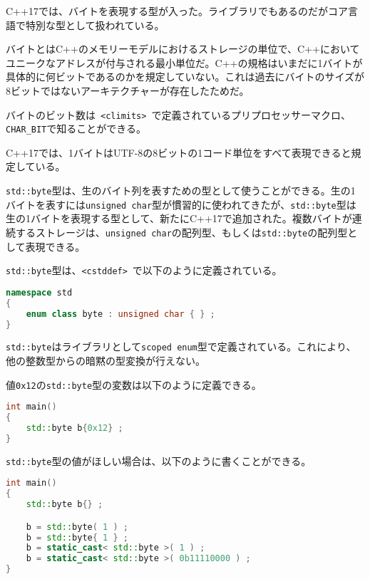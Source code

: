 %

C++17では、バイトを表現する型が入った。ライブラリでもあるのだがコア言語で特別な型として扱われている。

バイトとはC++のメモリーモデルにおけるストレージの単位で、C++においてユニークなアドレスが付与される最小単位だ。C++の規格はいまだに1バイトが具体的に何ビットであるのかを規定していない。これは過去にバイトのサイズが8ビットではないアーキテクチャーが存在したためだ。

バイトのビット数は~\lstinline!<climits>!~で定義されているプリプロセッサーマクロ、\lstinline!CHAR_BIT!で知ることができる。

C++17では、1バイトはUTF-8の8ビットの1コード単位をすべて表現できると規定している。

\lstinline!std::byte!型は、生のバイト列を表すための型として使うことができる。生の1バイトを表すには\lstinline!unsigned char!型が慣習的に使われてきたが、\lstinline!std::byte!型は生の1バイトを表現する型として、新たにC++17で追加された。複数バイトが連続するストレージは、\lstinline!unsigned char!の配列型、もしくは\lstinline!std::byte!の配列型として表現できる。

\lstinline!std::byte!型は、\lstinline!<cstddef>!~で以下のように定義されている。

\begin{lstlisting}[language=C++]
namespace std
{
    enum class byte : unsigned char { } ;
}
\end{lstlisting}

\lstinline!std::byte!はライブラリとして\lstinline!scoped enum!型で定義されている。これにより、他の整数型からの暗黙の型変換が行えない。

値\lstinline!0x12!の\lstinline!std::byte!型の変数は以下のように定義できる。

\begin{lstlisting}[language=C++]
int main()
{
    std::byte b{0x12} ;
}
\end{lstlisting}

\lstinline!std::byte!型の値がほしい場合は、以下のように書くことができる。

\begin{lstlisting}[language=C++]
int main()
{
    std::byte b{} ;

    b = std::byte( 1 ) ;
    b = std::byte{ 1 } ;
    b = static_cast< std::byte >( 1 ) ;
    b = static_cast< std::byte >( 0b11110000 ) ;
}
\end{lstlisting}

